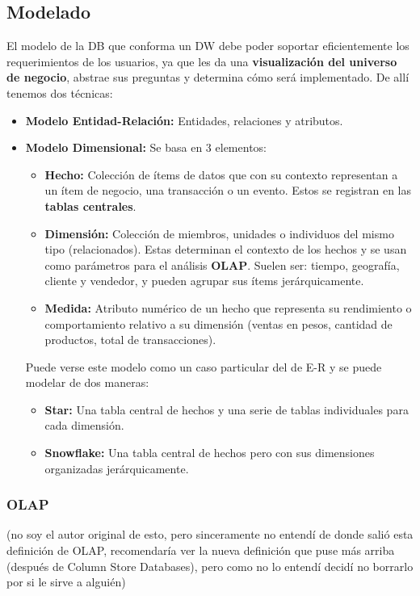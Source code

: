 \subsection*{Modelado}
El modelo de la DB que conforma un DW debe poder soportar eficientemente los requerimientos de los usuarios, ya que les da una \textbf{visualización del universo de negocio}, abstrae sus preguntas y determina cómo será implementado. De allí tenemos dos técnicas:
\begin{itemize}
    \item \textbf{Modelo Entidad-Relación:} Entidades, relaciones y atributos.
    \item \textbf{Modelo Dimensional:} Se basa en 3 elementos:
    \begin{itemize}
        \item \textbf{Hecho:} Colección de ítems de datos que con su contexto representan a un ítem de negocio, una transacción o un evento. Estos se registran en las \textbf{tablas centrales}.
        \item \textbf{Dimensión:} Colección de miembros, unidades o individuos del mismo tipo (relacionados). Estas determinan el contexto de los hechos y se usan como parámetros para el análisis \textbf{OLAP}. Suelen ser: tiempo, geografía, cliente y vendedor, y pueden agrupar sus ítems jerárquicamente.
        \item \textbf{Medida:} Atributo numérico de un hecho que representa su rendimiento o comportamiento relativo a su dimensión (ventas en pesos, cantidad de productos, total de transacciones).
    \end{itemize}
    Puede verse este modelo como un caso particular del de E-R y se puede modelar de dos maneras:
    \begin{itemize}
        \item \textbf{Star:} Una tabla central de hechos y una serie de tablas individuales para cada dimensión.
        \item \textbf{Snowflake:} Una tabla central de hechos pero con sus dimensiones organizadas jerárquicamente.
    \end{itemize}
\end{itemize}

\subsubsection*{OLAP}
(no soy el autor original de esto, pero sinceramente no entendí de donde salió esta definición de OLAP, recomendaría ver la nueva definición que puse más arriba (después de Column Store Databases), pero como no lo entendí decidí no borrarlo por si le sirve a alguién)

